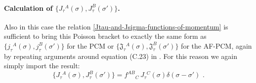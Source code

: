 \documentclass[12pt]{article}
\numberwithin{equation}{section}
\begin{document}
\paragraph{Calculation of $\{ J_{\tau}{}^{A}(\sigma),J_{\tau}^{B}(\sigma') \}$.} Also in this case the relation \eqref{Jtau-and-Jsigma-functions-of-momentum} is sufficient to bring this Poisson bracket to exactly the same form as $\{ j_{\tau}{}^{A}(\sigma),j_{\tau}^{B}(\sigma') \}$ for the PCM or $\{ \mathfrak{J}_{\tau}{}^{A}(\sigma),\mathfrak{J}_{\tau}^{B}(\sigma') \}$ for the AF-PCM, again by repeating arguments around equation (C.23) in \cite{Bielli:2024ach}. For this reason we again simply import the result:
\begin{equation}\label{YB-Jtau-Jtau-bracket}
\{ J_{\tau}{}^{A}(\sigma),J_{\tau}^{B}(\sigma') \} = f^{AB}{}_{C} \, J_{\tau}{}^{C}(\sigma)\delta(\sigma-\sigma') \,\, .
\end{equation}
\end{document}

